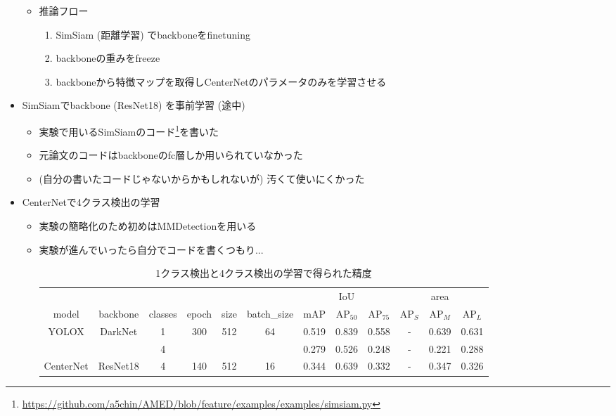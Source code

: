\documentclass[a4j]{ujarticle}
\begin{document}
\begin{itemize}
\begin{itemize}
                \item 推論フロー
                \begin{enumerate}
                    \item SimSiam (距離学習) でbackboneをfinetuning
                    \item backboneの重みをfreeze
                    \item backboneから特徴マップを取得しCenterNet\cite{centernet}のパラメータのみを学習させる
                \end{enumerate}
            \end{itemize}
            \item SimSiamでbackbone (ResNet18) を事前学習 (途中)
            \begin{itemize}
                \item 実験で用いるSimSiam\cite{simsiam}のコード\footnote{\url{https://github.com/a5chin/AMED/blob/feature/examples/examples/simsiam.py}}を書いた
                \item 元論文のコードはbackboneのfc層しか用いられていなかった
                \item (自分の書いたコードじゃないからかもしれないが) 汚くて使いにくかった
            \end{itemize}
            \item CenterNet\cite{centernet}で4クラス検出の学習
            \begin{itemize}
                \item 実験の簡略化のため初めはMMDetectionを用いる
                \item 実験が進んでいったら自分でコードを書くつもり...

            \begin{table}[h]
                \centering
                \caption{1クラス検出と4クラス検出の学習で得られた精度}
                \label{tab:compare_models}
                \begin{tabular}{cccccc|ccc|ccc}
                    & & & & & & & IoU & & & area & \\
                    model & backbone & classes & epoch & size & batch\_size & mAP & AP$_{50}$ & AP$_{75}$ & AP$_S$ & AP$_M$ & AP$_L$ \\ \hline
                    \multirow{2}{*}{YOLOX\cite{yolox}} & \multirow{2}{*}{DarkNet} & 1 & \multirow{2}{*}{300} & \multirow{2}{*}{512} & \multirow{2}{*}{64} & 0.519 & 0.839 & 0.558 & - & 0.639 & 0.631 \\
                    &  & 4 &  &  &  & 0.279 & 0.526 & 0.248 & - & 0.221 & 0.288 \\ \hline
                    CenterNet\cite{centernet} & ResNet18 & 4 & 140 & 512 & 16 & 0.344 & 0.639 & 0.332 & - & 0.347 & 0.326
                \end{tabular}
            \end{table}


\end{itemize}
\end{itemize}
\end{document}
